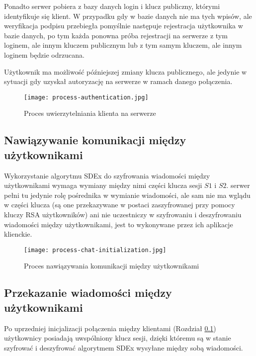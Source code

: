 \documentclass[../main.tex]{subfiles}
\begin{document}
Ponadto serwer pobiera z bazy danych login i klucz publiczny, którymi identyfikuje się klient. W przypadku gdy w bazie danych nie ma tych wpisów, ale weryfikacja podpisu przebiegła pomyślnie następuje rejestracja użytkownika w bazie danych, po tym każda ponowna próba rejestracji na serwerze z tym loginem, ale innym kluczem publicznym lub z tym samym kluczem, ale innym loginem będzie odrzucana.

Użytkownik ma możliwość późniejszej zmiany klucza publicznego, ale jedynie w sytuacji gdy uzyskał autoryzację na serwerze w ramach danego połączenia.

\begin{figure}[H]
	\centering
	\texttt{[image: process-authentication.jpg]}
	\caption{Proces uwierzytelniania klienta na serwerze}
\end{figure}

\subsection{Nawiązywanie komunikacji między użytkownikami}\label{sec:process-chat-initialization}

Wykorzystanie algorytmu SDEx do szyfrowania wiadomości między użytkownikami wymaga wymiany między nimi części klucza sesji $S1$ i $S2$. serwer pełni tu jedynie rolę pośrednika w wymianie wiadomości, ale sam nie ma wglądu w części klucza (są one przekazywane w postaci zaszyfrowanej przy pomocy kluczy RSA użytkowników) ani nie uczestniczy w szyfrowaniu i deszyfrowaniu wiadomości między użytkownikami, jest to wykonywane przez ich aplikacje klienckie.

\begin{landscape}
	\begin{figure}[H]
		\centering
		\texttt{[image: process-chat-initialization.jpg]}
		\caption{Proces nawiązywania komunikacji między użytkownikami}
	\end{figure}
\end{landscape}

\subsection{Przekazanie wiadomości między użytkownikami}\label{sec:process-message-exchange}

Po uprzedniej inicjalizacji połączenia między klientami (Rozdział \ref{sec:process-chat-initialization}) użytkownicy posiadają uwspólniony klucz sesji, dzięki któremu są w stanie szyfrować i deszyfrować algorytmem SDEx wysyłane między sobą wiadomości.
\end{document}
